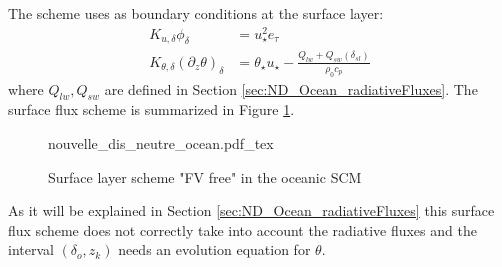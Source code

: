 The scheme uses as boundary conditions at the surface layer:
\begin{equation}
\label{eq:ND_Ocean_boundaryConditionFVfree}
\begin{aligned}
	K_{u,\delta} \phi_{\delta} &=
	u_\star^2 e_\tau
	\\
	K_{\theta, \delta} (\partial_z \theta)_\delta &= 
	\theta_\star u_\star - \frac{Q_{lw} + Q_{sw}(\delta_{sl})}{\rho_0 c_p}
  \end{aligned}
\end{equation}
where $Q_{lw}, Q_{sw}$ are defined in Section
\ref{sec:ND_Ocean_radiativeFluxes}.
The surface flux scheme is summarized in Figure
\ref{fig:ND_Ocean_nouvelle_dis_neutre}.
\begin{figure}
	{nouvelle_dis_neutre_ocean.pdf_tex}
	\caption{Surface layer scheme "FV free" in the oceanic SCM}
	\label{fig:ND_Ocean_nouvelle_dis_neutre}
\end{figure}
As it will be explained
in Section \ref{sec:ND_Ocean_radiativeFluxes} this surface flux scheme
does not correctly take into account the radiative fluxes and the
interval $(\delta_o, z_k)$ needs an evolution equation for $\theta$.

